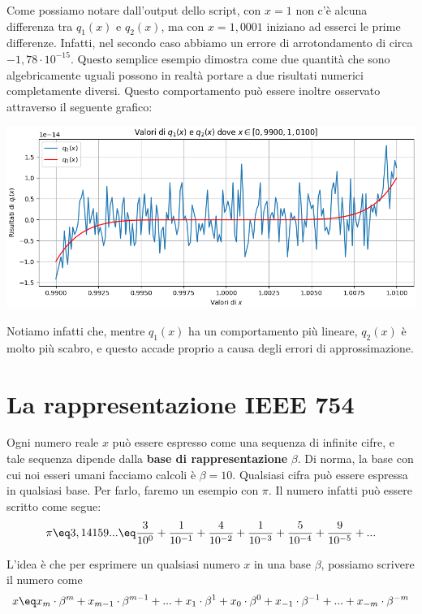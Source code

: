 \begin{example}
    Come possiamo notare dall'output dello script, con $x = 1$ non c'è alcuna differenza tra $q_1(x)$ e $q_2(x)$, ma con $x = 1,0001$ iniziano ad esserci le prime differenze. Infatti, nel secondo caso abbiamo un errore di arrotondamento di circa $-1,78 \cdot 10^{-15}$. Questo semplice esempio dimostra come due quantità che sono algebricamente uguali possono in realtà portare a due risultati numerici completamente diversi.
    \nwl
    Questo comportamento può essere inoltre osservato attraverso il seguente grafico:
    \begin{center}
        \includegraphics[width = \linewidth]{assets/image-001.png}
    \end{center}

    Notiamo infatti che, mentre $q_1(x)$ ha un comportamento più lineare, $q_2(x)$ è molto più scabro, e questo accade proprio a causa degli errori di approssimazione.
\end{example}

\section{La rappresentazione IEEE 754}

Ogni numero reale $x$ può essere espresso come una sequenza di infinite cifre, e tale sequenza dipende dalla \textbf{base di rappresentazione} $\beta$. Di norma, la base con cui noi esseri umani facciamo calcoli è $\beta = 10$.
\nwl
Qualsiasi cifra può essere espressa in qualsiasi base. Per farlo, faremo un esempio con $\pi$. Il numero infatti può essere scritto come segue:
\[ \pi \eq 3,14159... \eq \frac{3}{10^0} + \frac{1}{10^{-1}} + \frac{4}{10^{-2}} + \frac{1}{10^{-3}} + \frac{5}{10^{-4}} + \frac{9}{10^{-5}} + ... \]

L'idea è che per esprimere un qualsiasi numero $x$ in una base $\beta$, possiamo scrivere il numero come
\[ x \eq x_m \cdot \beta^m + x_{m-1} \cdot \beta^{m-1} + ... + x_{1} \cdot \beta^{1} + x_{0} \cdot \beta^{0} + x_{-1} \cdot \beta^{-1} + ... + x_{-m} \cdot \beta^{-m} \]


